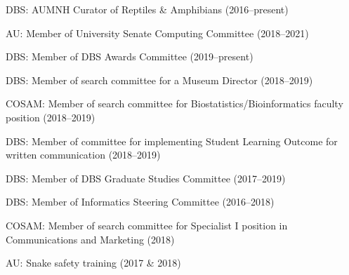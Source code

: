 \begin{veryTightItemize}
    \item DBS: AUMNH Curator of Reptiles \& Amphibians (2016--present)
    \item AU: Member of University Senate Computing Committee (2018--2021)
    \item DBS: Member of DBS Awards Committee (2019--present)
    \item DBS: Member of search committee for a Museum Director (2018--2019)
    \item COSAM: Member of search committee for Biostatistics/Bioinformatics
        faculty position (2018--2019)
    \item DBS: Member of committee for implementing Student Learning Outcome
        for written communication (2018--2019)
    \item DBS: Member of DBS Graduate Studies Committee (2017--2019)
    \item DBS: Member of Informatics Steering Committee (2016--2018)
    \item COSAM: Member of search committee for Specialist I position in
        Communications and Marketing (2018)
    \item AU: Snake safety training (2017 \& 2018)
\end{veryTightItemize}

